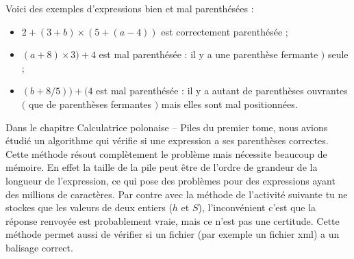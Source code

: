 \documentclass[11pt,class=report,crop=false]{standalone}
\begin{document}

\begin{cours}
Voici des exemples d'expressions bien et mal parenthésées :
\begin{itemize}
	\item $2 + (3 + b) \times (5 + (a - 4))$ est correctement parenthésée ;
	\item $(a+ 8) \times 3 ) + 4$ est mal parenthésée : il y a une parenthèse fermante \og{}$)$\fg{}  seule ;
	\item $(b + 8 / 5)) + (4$ est mal parenthésée : il y a autant de parenthèses ouvrantes 
	\og{}$($\fg{} que de parenthèses fermantes \og{}$)$\fg{} mais elles sont mal positionnées.
\end{itemize}


Dans le chapitre \og{}Calculatrice polonaise – Piles\fg{} du premier tome, nous avions étudié un algorithme qui vérifie si une expression a ses parenthèses correctes. 
Cette méthode résout complètement le problème mais nécessite beaucoup de mémoire. En effet la taille de la pile peut être de l'ordre de grandeur de la longueur de l'expression, ce qui pose des problèmes pour des expressions ayant des millions de caractères. Par contre avec la méthode de l'activité suivante tu ne stockes que les valeurs de deux entiers ($h$ et $S$), l'inconvénient c'est que la réponse renvoyée est probablement vraie,
mais ce n'est pas une certitude. 
Cette méthode permet aussi de vérifier si un fichier (par exemple un fichier \og{}xml\fg{}) a un balisage correct.
\end{cours}



\end{document}
